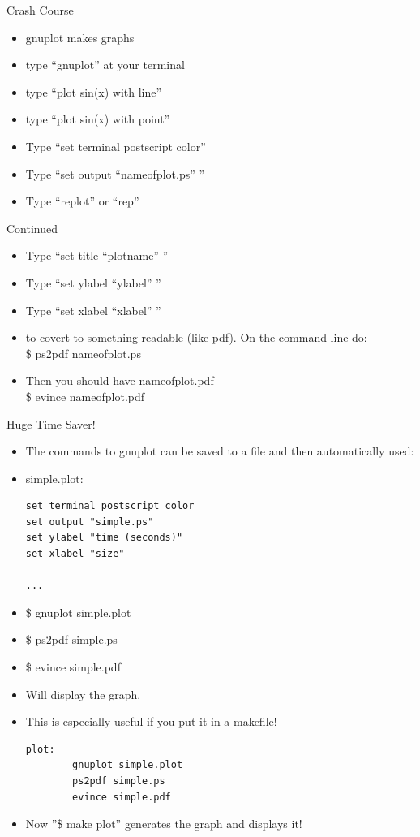 \documentclass{beamer}
\begin{document}
\begin{frame}{Crash Course}
\begin{itemize}
\item gnuplot makes graphs
\item type ``gnuplot'' at your terminal 
\item type ``plot sin(x) with line''
\item type ``plot sin(x) with point''

\item Type ``set terminal postscript color''
\item Type ``set output ``nameofplot.ps'' ''
\item Type ``replot'' or ``rep''
\end{itemize}
\end{frame}

\begin{frame}{Continued}
\begin{itemize}
\item Type ``set title ``plotname'' ''
\item Type ``set ylabel ``ylabel'' ''                                    
\item Type ``set xlabel ``xlabel'' ''

\item to covert to something readable (like pdf).  On the command line do:\\
\$ ps2pdf nameofplot.ps
\item Then you should have nameofplot.pdf \\
\$ evince nameofplot.pdf
\end{itemize}
\end{frame}

\begin{frame}[fragile]{Huge Time Saver!}
\begin{itemize}
\item The commands to gnuplot can be saved to a file and then automatically used:
\item simple.plot:\\
\begin{lstlisting}
set terminal postscript color
set output "simple.ps"
set ylabel "time (seconds)"
set xlabel "size"

...
\end{lstlisting}
\item \$ gnuplot simple.plot
\item \$ ps2pdf simple.ps
\item \$ evince simple.pdf
\item Will display the graph.
\item This is especially useful if you put it in a makefile!
\begin{lstlisting}
plot:
        gnuplot simple.plot
        ps2pdf simple.ps
        evince simple.pdf
\end{lstlisting}
\item Now ''\$ make plot'' generates the graph and displays it!
\end{itemize}
\end{frame}
\end{document}
